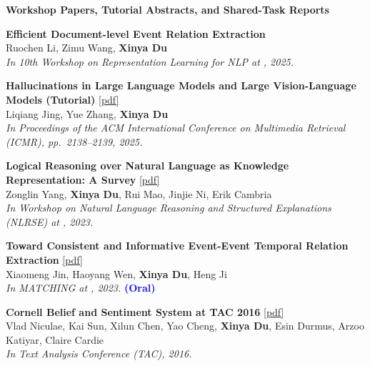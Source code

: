 \vspace{1.5mm}
\noindent \textbf{Workshop Papers, Tutorial Abstracts, and Shared-Task Reports}
\begin{enumerate}[{[}1{]},resume,leftmargin=*]

\parbox{\linewidth}{
\item
 
{\bf Efficient Document-level Event Relation Extraction} \\
Ruochen Li, Zimu Wang, \textbf{Xinya Du} \\
{\it In 10th Workshop on Representation Learning for NLP at \NAACL, 2025.} \\
}

\parbox{\linewidth}{
\item\label{pub:icmr}
{\bf Hallucinations in Large Language Models and Large Vision-Language Models (Tutorial)}
\href{https://doi.org/10.1145/3731715.3734581}{{{[pdf]}}} \\
Liqiang Jing, Yue Zhang, \textbf{Xinya Du} \\
{\it In Proceedings of the ACM International Conference on Multimedia Retrieval (ICMR), pp.\ 2138--2139, 2025.} \\
}

\parbox{\linewidth}{
\item\label{pub:nlrse}
{\bf Logical Reasoning over Natural Language as Knowledge Representation: A Survey}
\href{https://arxiv.org/abs/2303.12023}{{{[pdf]}}} \\
Zonglin Yang, \textbf{Xinya Du}, Rui Mao, Jinjie Ni, Erik Cambria \\
{\it In Workshop on Natural Language Reasoning and Structured Explanations (NLRSE) at \ACL, 2023.} \\
}

\parbox{\linewidth}{
\item
 
{\bf Toward Consistent and Informative Event-Event Temporal Relation Extraction} 
\href{https://aclanthology.org/2023.matching-1.3.pdf}{{[pdf]}} \\
Xiaomeng Jin, Haoyang Wen, \textbf{Xinya Du}, Heng Ji \\
{\it In MATCHING at \ACL, 2023.} {\textcolor{blue}{\textbf{(Oral)}}} \\ 
}

\parbox{\linewidth}{
\item
{\bf Cornell Belief and Sentiment System at TAC 2016} 
\href{https://tac.nist.gov/publications/2016/participant.papers/TAC2016.cornpittmich.proceedings.pdf}{{{[pdf]}}} \\
{Vlad Niculae, Kai Sun, Xilun Chen, Yao Cheng, {\bf Xinya Du}, Esin Durmus, Arzoo Katiyar, Claire Cardie} \\
{\it In Text Analysis Conference (TAC), 2016.}\\
}

\end{enumerate}

